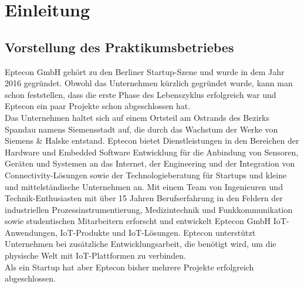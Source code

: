 \chapter{Einleitung}
\label{sec:intro}
\section{Vorstellung des Praktikumsbetriebes}
\label{sec:intro:dfki}
Eptecon GmbH gehört zu den Berliner Startup-Szene und wurde in dem Jahr 2016 gegründet. Obwohl das Unternehmen kürzlich gegründet wurde, kann man schon feststellen, dass die erste Phase des Lebenszyklus erfolgreich war und Eptecon ein paar Projekte schon abgeschlossen hat. \\
Das Unternehmen haltet sich auf einem Ortsteil am Ostrands des Bezirks Spandau namens Siemensstadt auf, die durch das Wachstum der Werke von Siemens \& Halske entstand. 
Eptecon bietet Dienstleistungen in den Bereichen der Hardware und Embedded Software Entwicklung für die Anbindung von Sensoren, Geräten und Systemen an das Internet, der Engineering und der Integration von Connectivity-Lösungen sowie der Technologieberatung für Startups und kleine und mittelständische Unternehmen an. Mit einem Team von Ingenieuren und Technik-Enthusiasten mit über 15 Jahren Berufserfahrung in den Feldern der industriellen Prozessinstrumentierung, Medizintechnik und Funkkommunikation sowie studentischen Mitarbeitern erforscht und entwickelt Eptecon GmbH IoT-Anwendungen, IoT-Produkte und IoT-Lösungen. Eptecon unterstützt Unternehmen bei zusätzliche Entwicklungsarbeit, die benötigt wird, um die physische Welt mit IoT-Plattformen zu verbinden. \\
Als ein Startup hat aber Eptecon bisher mehrere Projekte erfolgreich abgeschlossen.
